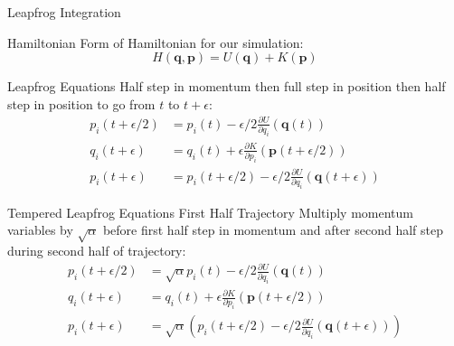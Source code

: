 \documentclass{beamer}
\begin{document}
    \begin{frame}{Leapfrog Integration}
    {
    \begin{block}{Hamiltonian}
        Form of Hamiltonian for our simulation:
        \begin{equation*}
            \label{eq:HamiltonianUPlusK}
            H\left(\bm{q},\bm{p}\right) = U\left(\bm{q}\right) + K\left(\bm{p}\right)
        \end{equation*}
    \end{block}
    }
    {
    \begin{block}{Leapfrog Equations}
        Half step in momentum then full step in position then half step in position to go from $t$ to $t+\epsilon$: 
        \begin{align*}
                p_i\left(t+\epsilon/2\right) &  = p_i\left(t\right) - \epsilon/2\frac{\partial U}{\partial q_i}\left(\bm{q}\left(t\right)\right) \\
                q_i\left(t+\epsilon\right) &  = q_i\left(t\right) + \epsilon\frac{\partial K}{\partial p_i}\left(\bm{p}\left(t+\epsilon/2\right)\right) \\
                p_i\left(t+\epsilon\right) &  = p_i\left(t+\epsilon/2\right) - \epsilon/2\frac{\partial U}{\partial q_i}\left(\bm{q}\left(t+\epsilon\right)\right)
            \end{align*}
    \end{block}
    }
    {
        \begin{block}{Tempered Leapfrog Equations First Half Trajectory}
            Multiply momentum variables by $\sqrt{\alpha}$ before first half step in momentum and after second half step during second half of trajectory:
            \begin{align*}
                 p_i\left(t+\epsilon/2\right) & = \sqrt{\alpha}p_i\left(t\right) - \epsilon/2\frac{\partial U}{\partial q_i}\left(\bm{q}\left(t\right)\right) \\
                \label{eq:TLeapFrogEq2}q_i\left(t+\epsilon\right) & = q_i\left(t\right) + \epsilon\frac{\partial K}{\partial p_i}\left(\bm{p}\left(t+\epsilon/2\right)\right) \\
                \label{eq:TLeapFrogEq3}p_i\left(t+\epsilon\right) & = \sqrt{\alpha}\left(p_i\left(t+\epsilon/2\right) - \epsilon/2\frac{\partial U}{\partial q_i}\left(\bm{q}\left(t+\epsilon\right)\right)\right)
            \end{align*}
        \end{block}
    }

\end{frame}
\end{document}

